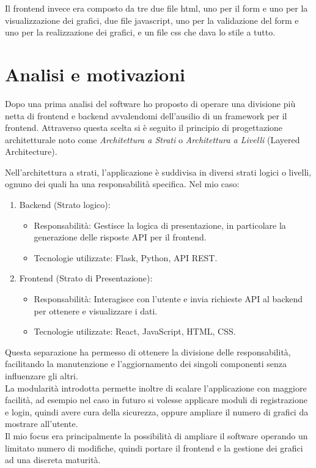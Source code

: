 Il frontend invece era composto da tre due file html, uno per il form e uno per la visualizzazione dei grafici, due file javascript, uno per la validazione del form e uno per la realizzazione dei grafici, e un file css che dava lo stile a tutto. 

\section{Analisi e motivazioni}

Dopo una prima analisi del software ho proposto di operare una divisione più netta di frontend e backend avvalendomi dell'ausilio di un framework per il frontend. Attraverso questa scelta si è seguito il principio di progettazione architetturale noto come \textit{Architettura a Strati} o \textit{Architettura a Livelli} (Layered Architecture).

Nell'architettura a strati, l'applicazione è suddivisa in diversi strati logici o livelli, ognuno dei quali ha una responsabilità specifica. Nel mio caso:
\begin{enumerate}
\item Backend (Strato logico):
    \begin{itemize}
        \item  Responsabilità: Gestisce la logica di presentazione, in particolare la generazione delle risposte API per il frontend.
        \item  Tecnologie utilizzate: Flask, Python, API REST.
    \end{itemize}
\item Frontend (Strato di Presentazione):
 \begin{itemize}
    \item Responsabilità: Interagisce con l'utente e invia richieste API al backend per ottenere e visualizzare i dati.
    \item Tecnologie utilizzate: React, JavaScript, HTML, CSS.
    \end{itemize}
\end{enumerate}

Questa separazione ha permesso di ottenere la divisione delle responsabilità, facilitando la manutenzione e l'aggiornamento dei singoli componenti senza influenzare gli altri.\\
La modularità introdotta permette inoltre di scalare l'applicazione con maggiore facilità, ad esempio nel caso in futuro si volesse applicare moduli di registrazione e login, quindi avere cura della sicurezza, oppure ampliare il numero di grafici da mostrare all'utente. \\
Il mio focus era principalmente la possibilità di ampliare il software operando un limitato numero di modifiche, quindi portare il frontend e la gestione dei grafici ad una discreta maturità.

